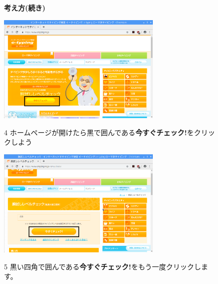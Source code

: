 \begin{figure}
  \textbf{考え方(続き)}

  \centering
  \includegraphics[width=0.7\textwidth]{text01-img/textbook-img087.png}
  \begin{minipage}{0.7\textwidth}
    4 ホームページが開けたら黒で囲んである\textbf{今すぐチェック!}をクリックしよう

  \end{minipage}
\end{figure}





\begin{figure}
  \centering
  \includegraphics[width=0.7\textwidth]{text01-img/textbook-img088.png}

  \begin{minipage}{0.7\textwidth}
    5 黒い四角で囲んである\textbf{今すぐチェック!}をもう一度クリックします。
  \end{minipage}
\end{figure}

\clearpage



